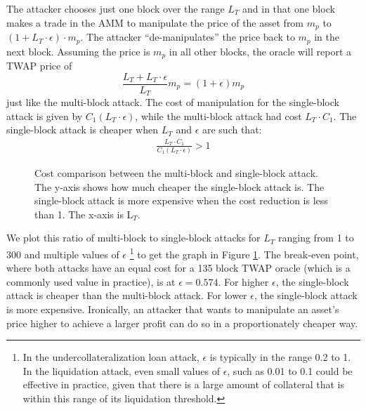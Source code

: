 The attacker chooses just one block over the range $L_T$ and in that one block makes a trade in the AMM to manipulate the price of the asset from $m_p$ to $(1 + L_T \cdot \epsilon) \cdot m_p$. The attacker ``de-manipulates'' the price back to $m_p$ in the next block. Assuming the price is $m_p$ in all other blocks, the oracle will report a TWAP price of $$\frac{ L_{T} + L_T \cdot \epsilon}{L_{T}} m_p = (1+\epsilon) m_p$$ just like the multi-block attack. The cost of manipulation for the single-block attack is given by $C_1(L_T \cdot \epsilon)$, while the multi-block attack had cost $L_T \cdot C_1$. The single-block attack is cheaper when $L_T$ and $\epsilon$ are such that:
\begin{align}
   \frac{L_T \cdot C_1}{C_1(L_T \cdot \epsilon)} > 1
   \label{OneBlockCheaperEq}
\end{align}
\begin{figure}[h]
\caption{Cost comparison between the multi-block and single-block attack. The y-axis shows how much cheaper the single-block attack is. The single-block attack is more expensive when the cost reduction is less than 1. The x-axis is L$_T$.}
\label{figureCostDiff}
\end{figure}
We plot this ratio of multi-block to single-block attacks for $L_T$ ranging from 1 to 300 and multiple values of $\epsilon$ \footnote{In the undercollateralization loan attack, $\epsilon$ is typically in the range 0.2 to 1. In the liquidation attack, even small values of $\epsilon$, such as 0.01 to 0.1 could be effective
in practice, given that there is a large amount of collateral that is within this range of its liquidation threshold.} to get the graph in Figure \ref{figureCostDiff}. The break-even point, where both attacks have an equal cost for a 135 block TWAP oracle (which is a commonly used value in practice), is at $\epsilon = 0.574$. For higher $\epsilon$, the single-block attack is cheaper than the multi-block attack. For lower $\epsilon$, the single-block attack is more expensive. Ironically, an attacker that wants to manipulate an asset's price higher to achieve a larger profit can do so in a proportionately cheaper way. 

